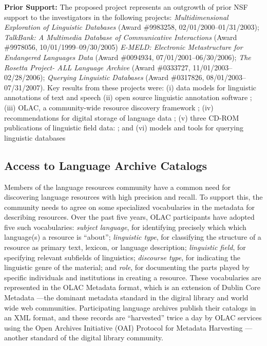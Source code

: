\textbf{Prior Support:} The proposed project represents an outgrowth of
prior NSF support to the investigators in the following projects:
\textit{Multidimensional Exploration of Linguistic Databases}
  (Award \#9983258, 02/01/2000--01/31/2003);
\textit{TalkBank: A Multimedia Database of Communicative Interactions}
  (Award \#9978056, 10/01/1999--09/30/2005)
\textit{E-MELD: Electronic Metastructure for Endangered Languages Data}
  (Award \#0094934, 07/01/2001--06/30/2006);
\textit{The Rosetta Project- ALL Language Archive}
  (Award \#0333727, 11/01/2003--02/28/2006);
\textit{Querying Linguistic Databases}
  (Award \#0317826, 08/01/2003--07/31/2007).
Key results from these projects were:
(i) data models for linguistic annotations of text and speech
\citep{BirdLiberman01,MaedaBird00,GraffBird00,CottonBird02,CieriBird01,ATLAS00,BirdHarrington01}
(ii) open source linguistic annotation software
\citep{Bird01acl,MaedaBird02,BirdMaeda02,MaLee02};
(iii) OLAC, a community-wide resource discovery framework
\citep{BirdSimons00,BirdSimons00survey,BirdSimons01,BirdSimons02workshop,Simons02query,SimonsBird03lht,BirdSimons03chum,Simons03display,SimonsBird03llc,BirdSimons04metadata};
(iv) recommendations for digital storage of language data
\citep{BirdSimons03language};
(v) three CD-ROM publications of linguistic field data:
\citep{BirdBell01,Bird03paradigms,Bird03ngomba};
and
(vi) models and tools for querying linguistic databases
\citep{BirdBuneman01,BirdBunemanTan00,LaiBird04,Bird05planx,Bird06icde}


\subsection{Access to Language Archive Catalogs}


Members of the language resources community have a common need for
discovering language resources with high precision and recall.  To
support this, the community needs to agree on
some specialized vocabularies in the metadata for
describing resources.  Over the past five years, OLAC
participants have adopted five such vocabularies:
\textit{subject language},
  for identifying precisely which which language(s) a resource is ``about'';
\textit{linguistic type},
  for classifying the structure of a resource as primary text,
  lexicon, or language description;
\textit{linguistic field},
  for specifying relevant subfields of linguistics;
\textit{discourse type},
  for indicating the linguistic genre of the material;
  and
\textit{role},
  for documenting the parts played by specific individuals and institutions
  in creating a resource.
These vocabularies are represented in the OLAC Metadata format,
which is an extension of Dublin Core Metadata \citep{BirdSimons04metadata}---the dominant metadata standard in the
digiral library and world wide web communities.
Participating language archives publish their catalogs in an XML
format, and these records are ``harvested'' twice a day by OLAC services
using the Open Archives Initiative (OAI) Protocol for Metadata Harvesting
\citep{SimonsBird03lht}---another standard of the digital library community.


